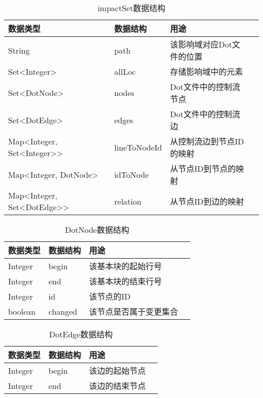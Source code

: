 \begin{table}[H]
	\caption{impactSet数据结构}
	\label{impact_data}
	\centering
	\begin{tabular}{lllc}
		\toprule[1.5pt]
		{\heiti 数据类型} &{\heiti 数据结构} & {\heiti 用途} \\\midrule[1pt]
		String     &  path & 该影响域对应Dot文件的位置 \\
		Set<Integer>  &  allLoc & 存储影响域中的元素 \\
		Set<DotNode>  & nodes & Dot文件中的控制流节点\\
		Set<DotEdge>  & edges & Dot文件中的控制流边\\
		Map<Integer, Set<Integer>> & lineToNodeId & 从控制流边到节点ID的映射\\
		Map<Integer, DotNode>  & idToNode & 从节点ID到节点的映射 \\
		Map<Integer, Set<DotEdge>>  &  relation & 从节点ID到边的映射 \\
		\bottomrule[1.5pt] 
	\end{tabular}
\end{table}

\begin{table}[H]
	\caption{DotNode数据结构}
	\label{node_data}
	\centering
	\begin{tabular}{lllc}
		\toprule[1.5pt]
		{\heiti 数据类型} &{\heiti 数据结构} & {\heiti 用途} \\\midrule[1pt]
		Integer    &   begin & 该基本块的起始行号 \\
		Integer    &   end  & 该基本块的结束行号 \\
		Integer    & id & 该节点的ID \\
		boolean    & changed & 该节点是否属于变更集合 \\
		\bottomrule[1.5pt] 
	\end{tabular}
\end{table}

\begin{table}[H]
	\caption{DotEdge数据结构}
	\label{edge_data}
	\centering
	\begin{tabular}{lllc}
		\toprule[1.5pt]
		{\heiti 数据类型} &{\heiti 数据结构} & {\heiti 用途} \\\midrule[1pt]
		Integer   & begin & 该边的起始节点 \\
		Integer  &   end & 该边的结束节点 \\
		\bottomrule[1.5pt] 
	\end{tabular}
\end{table}

